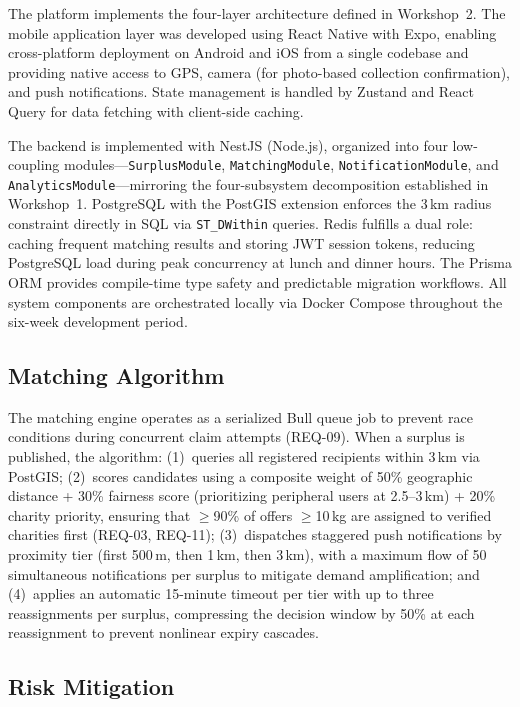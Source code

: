 \documentclass[conference]{IEEEtran}
\begin{document}
The platform implements the four-layer architecture defined in Workshop~2. The mobile application layer was developed using React Native with Expo, enabling cross-platform deployment on Android and iOS from a single codebase and providing native access to GPS, camera (for photo-based collection confirmation), and push notifications. State management is handled by Zustand and React Query for data fetching with client-side caching.

The backend is implemented with NestJS (Node.js), organized into four low-coupling modules---\texttt{SurplusModule}, \texttt{MatchingModule}, \texttt{NotificationModule}, and \texttt{AnalyticsModule}---mirroring the four-subsystem decomposition established in Workshop~1. PostgreSQL with the PostGIS extension enforces the 3\,km radius constraint directly in SQL via \texttt{ST\_DWithin} queries. Redis fulfills a dual role: caching frequent matching results and storing JWT session tokens, reducing PostgreSQL load during peak concurrency at lunch and dinner hours. The Prisma ORM provides compile-time type safety and predictable migration workflows. All system components are orchestrated locally via Docker Compose throughout the six-week development period.

\subsection{Matching Algorithm}

The matching engine operates as a serialized Bull queue job to prevent race conditions during concurrent claim attempts (REQ-09). When a surplus is published, the algorithm: (1)~queries all registered recipients within 3\,km via PostGIS; (2)~scores candidates using a composite weight of 50\% geographic distance + 30\% fairness score (prioritizing peripheral users at 2.5--3\,km) + 20\% charity priority, ensuring that $\geq$90\% of offers $\geq$10\,kg are assigned to verified charities first (REQ-03, REQ-11); (3)~dispatches staggered push notifications by proximity tier (first 500\,m, then 1\,km, then 3\,km), with a maximum flow of 50 simultaneous notifications per surplus to mitigate demand amplification; and (4)~applies an automatic 15-minute timeout per tier with up to three reassignments per surplus, compressing the decision window by 50\% at each reassignment to prevent nonlinear expiry cascades.

\subsection{Risk Mitigation}
\end{document}
